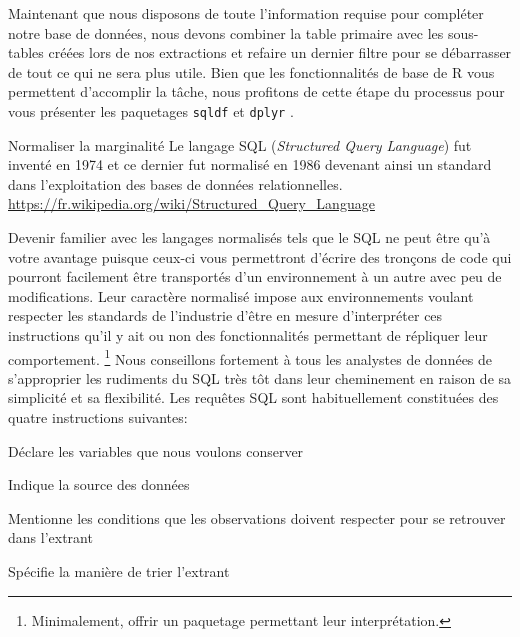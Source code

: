 \vspace{\baselineskip}
Maintenant que nous disposons de toute l'information requise pour compléter notre base de données, nous devons combiner la table primaire avec les sous-tables créées lors de nos extractions et refaire un dernier filtre pour se débarrasser de tout ce qui ne sera plus utile. Bien que les fonctionnalités de base de R vous permettent d'accomplir la tâche, nous profitons de cette étape du processus pour vous présenter les paquetages \texttt{sqldf} \cite{Rpackage:sqldf} et \texttt{dplyr} \cite{Rpackage:plyr}. \\

\begin{moreInfo}{Normaliser la marginalité}
	Le langage SQL (\emph{Structured Query Language}) fut inventé en 1974 et ce dernier fut normalisé en 1986 devenant ainsi un standard dans l'exploitation des bases de données relationnelles. \\
	\url{https://fr.wikipedia.org/wiki/Structured_Query_Language}
\end{moreInfo}

Devenir familier avec les langages normalisés tels que le SQL ne peut être qu'à votre avantage puisque ceux-ci vous permettront d'écrire des tronçons de code qui pourront facilement être transportés d'un environnement à un autre avec peu de modifications. Leur caractère normalisé impose aux environnements voulant respecter les standards de l'industrie d'être en mesure d'interpréter ces instructions qu'il y ait ou non des fonctionnalités permettant de répliquer leur comportement. \footnote{Minimalement, offrir un paquetage permettant leur interprétation.} \cite{SQL} Nous conseillons fortement à tous les analystes de données de s'approprier les rudiments du SQL très tôt dans leur cheminement en raison de sa simplicité et sa flexibilité. Les requêtes SQL sont habituellement constituées des quatre instructions suivantes: \\

\begin{description}[style=multiline,leftmargin=2cm]
	\item[Select] Déclare les variables que nous voulons conserver
	\item[From] Indique la source des données
	\item[Where] Mentionne les conditions que les observations doivent respecter pour se retrouver dans l'extrant
	\item[Order by] Spécifie la manière de trier l'extrant
\end{description}

